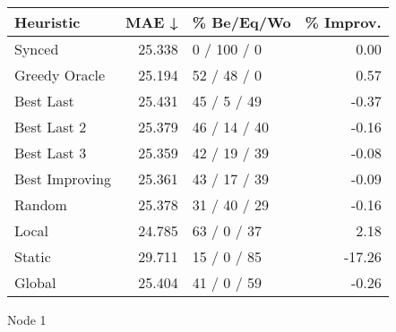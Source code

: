 \begin{tabular}{lrlr}
\toprule
\textbf{Heuristic} & \textbf{MAE ↓} & \textbf{\% Be/Eq/Wo} & \textbf{\% Improv.} \\
\midrule
            Synced &         25.338 &          0 / 100 / 0 &                0.00 \\
     Greedy Oracle &         25.194 &          52 / 48 / 0 &                0.57 \\
         Best Last &         25.431 &          45 / 5 / 49 &               -0.37 \\
       Best Last 2 &         25.379 &         46 / 14 / 40 &               -0.16 \\
       Best Last 3 &         25.359 &         42 / 19 / 39 &               -0.08 \\
    Best Improving &         25.361 &         43 / 17 / 39 &               -0.09 \\
            Random &         25.378 &         31 / 40 / 29 &               -0.16 \\
             Local &         24.785 &          63 / 0 / 37 &                2.18 \\
            Static &         29.711 &          15 / 0 / 85 &              -17.26 \\
            Global &         25.404 &          41 / 0 / 59 &               -0.26 \\
\bottomrule
\end{tabular}
\caption{Node 1}
\label{tab:iid_lr01_le2_bs4_1}
